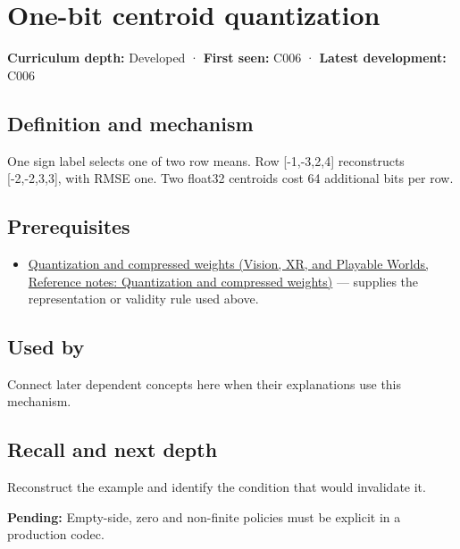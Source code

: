 \hypertarget{appendix-4ccd7a775813}{}\label{referencestart:appendix-4ccd7a775813}
\section{One-bit centroid quantization}\label{appendix-4ccd7a775813-one-bit-centroid-quantization}

\textbf{Curriculum depth:} Developed · \textbf{First seen:} C006 · \textbf{Latest development:} C006

\subsection{Definition and mechanism}\label{appendix-4ccd7a775813-definition-and-mechanism}

One sign label selects one of two row means. Row {[}-1,-3,2,4{]} reconstructs {[}-2,-2,3,3{]}, with RMSE one. Two float32 centroids cost 64 additional bits per row.

\subsection{Prerequisites}\label{appendix-4ccd7a775813-prerequisites}

\begin{itemize}
\tightlist
\item
  \href{../07-Vision-XR-and-Playable-Worlds/main.pdf\#nameddest=appendix-fdc7879e8bf2}{Quantization and compressed weights (Vision, XR, and Playable Worlds, Reference notes: Quantization and compressed weights)} --- supplies the representation or validity rule used above.
\end{itemize}

\subsection{Used by}\label{appendix-4ccd7a775813-used-by}

Connect later dependent concepts here when their explanations use this mechanism.

\subsection{Recall and next depth}\label{appendix-4ccd7a775813-recall-and-next-depth}

Reconstruct the example and identify the condition that would invalidate it.

\textbf{Pending:} Empty-side, zero and non-finite policies must be explicit in a production codec.

